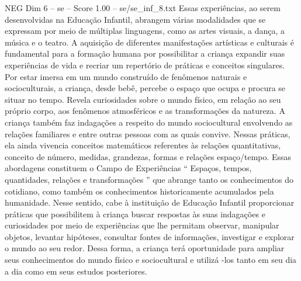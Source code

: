 \begin{textsample}{NEG Dim 6 – se – Score 1.00 – se/se\_inf\_8.txt}
Essas experiências, ao serem desenvolvidas na Educação Infantil, abrangem várias modalidades que se expressam por meio de múltiplas linguagens, como as artes visuais, a dança, a música e o teatro.
A aquisição de diferentes manifestações artísticas e culturais é fundamental para a formação humana por possibilitar a criança expandir suas experiências de vida e recriar um repertório de práticas e conceitos singulares.
Por estar imersa em um mundo construído de fenômenos naturais e socioculturais, a criança, desde bebê, percebe o espaço que ocupa e procura se situar no tempo.
Revela curiosidades sobre o mundo físico, em relação ao seu próprio corpo, aos fenômenos atmosféricos e as transformações da natureza.
A criança também faz indagações a respeito do mundo sociocultural envolvendo as relações familiares e entre outras pessoas com as quais convive.
Nessas práticas, ela ainda vivencia conceitos matemáticos referentes às relações quantitativas, conceito de número, medidas, grandezas, formas e relações espaço/tempo.
Essas abordagens constituem o Campo de Experiências “ Espaços, tempos, quantidades, relações e transformações ” que abrange tanto os conhecimentos do cotidiano, como também os conhecimentos historicamente acumulados pela humanidade.
Nesse sentido, cabe à instituição de Educação Infantil proporcionar práticas que possibilitem à criança buscar respostas às suas indagações e curiosidades por meio de experiências que lhe permitam observar, manipular objetos, levantar hipóteses, consultar fontes de informações, investigar e explorar o mundo ao seu redor.
Dessa forma, a criança terá oportunidade para ampliar seus conhecimentos do mundo físico e sociocultural e utilizá -los tanto em seu dia a dia como em seus estudos posteriores.

\end{textsample}

